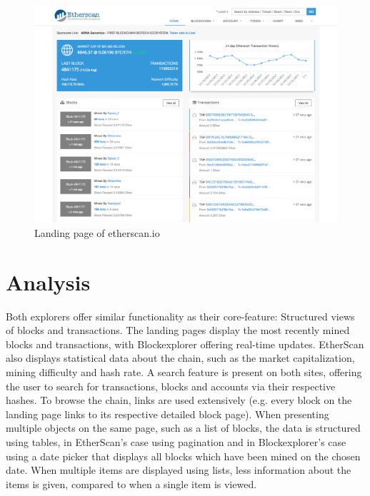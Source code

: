 \begin{figure}
  \includegraphics[width=\linewidth]{etherscan.png}
  \caption{Landing page of etherscan.io}
  \label{fig:etherscan1}
\end{figure}

\section{Analysis} \label{analysis}
Both explorers offer similar functionality as their core-feature: Structured views of blocks and transactions. The landing pages display the most recently mined blocks and transactions, with Blockexplorer offering real-time updates. EtherScan also displays statistical data about the chain, such as the market capitalization, mining difficulty and hash rate. A search feature is present on both sites, offering the user to search for transactions, blocks and accounts via their respective hashes. To browse the chain, links are used extensively (e.g. every block on the landing page links to its respective detailed block page). When presenting multiple objects on the same page, such as a list of blocks, the data is structured using tables, in EtherScan's case using pagination and in Blockexplorer's case using a date picker that displays all blocks which have been mined on the chosen date. When multiple items are displayed using lists, less information about the items is given, compared to when a single item is viewed.

